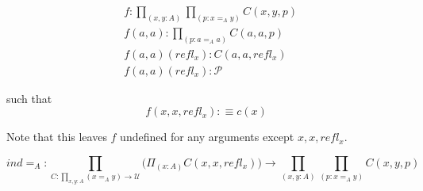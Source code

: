 \documentclass{article}
\begin{document}
\begin{align}
  &f:\prod_{(x,y:A)}\prod_{(p:x=_Ay)}C(x,y,p) \\
  &f(a,a):\prod_{(p:a=_Aa)}C(a,a,p) \\
  &f(a,a)(refl_x):C(a,a,refl_x) \\
  &f(a,a)(refl_x):\mathcal{P}
\end{align}

such that
\begin{equation}
  f(x,x,refl_x) :\equiv c(x)
\end{equation}

Note that this leaves \(f\) undefined for any arguments except \(x,x,refl_x\).

\[ind=_A: \prod_{C:\prod_{x,y:A}(x=_Ay)\to\mathcal{U}}\Big(\Pi_{(x:A)}C(x,x,refl_x)\Big)\to \prod_{(x,y:A)}\prod_{(p:x=_Ay)} C(x,y,p)\]
\end{document}

